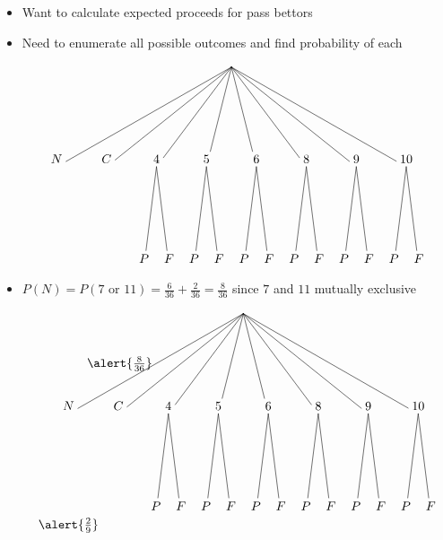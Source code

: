 \documentclass[handout]{beamer}
\theoremstyle{definition}
\begin{document}
\begin{frame}
\begin{itemize}
\item Want to calculate expected proceeds for pass bettors
\item Need to enumerate all possible outcomes and find probability of each
\[\begin{xy}<1.4cm,0cm>:
(4.5,0)="0"; (1,-2)="N"; (2,-2)="C"; (3,-2)="4";
(4,-2)="5"; (5,-2)="6"; (6,-2)="8"; (7,-2)="9"; (8,-2)="10";
"0";"N"*+!D{N}**\dir{-};
"0";"C"*+!D{C}**\dir{-};
"0";"4"*+!D{4}**\dir{-};
"0";"5"*+!D{5}**\dir{-};
"0";"6"*+!D{6}**\dir{-};
"0";"8"*+!D{8}**\dir{-};
"0";"9"*+!D{9}**\dir{-};
"0";"10"*+!D{10}**\dir{-};
"4";(2.75,-4)*+!D{P}**\dir{-};
"4";(3.25,-4)*+!D{F}**\dir{-};
"5";(3.75,-4)*+!D{P}**\dir{-};
"5";(4.25,-4)*+!D{F}**\dir{-};
"6";(4.75,-4)*+!D{P}**\dir{-};
"6";(5.25,-4)*+!D{F}**\dir{-};
"8";(5.75,-4)*+!D{P}**\dir{-};
"8";(6.25,-4)*+!D{F}**\dir{-};
"9";(6.75,-4)*+!D{P}**\dir{-};
"9";(7.25,-4)*+!D{F}**\dir{-};
"10";(7.75,-4)*+!D{P}**\dir{-};
"10";(8.25,-4)*+!D{F}**\dir{-};
\end{xy}\]
\end{itemize}
\end{frame}

\begin{frame}
\begin{itemize}
\item $P\left(N\right)=
P\left(\text{$7$ or $11$}\right)
=\frac{6}{36}+\frac{2}{36}=\frac{8}{36}$
since $7$ and $11$ mutually exclusive
\[\begin{xy}<1.4cm,0cm>:
(4.5,0)="0";
(1,-2)="N";(2,-2)="C";(3,-2)="4";(4,-2)="5";
(5,-2)="6";(6,-2)="8";(7,-2)="9";(8,-2)="10";
"0";"N"*+!D{N}**\dir{-}?*+!R{\alert{\frac{8}{36}}};
"0";"C"*+!D{C}**\dir{-};
"0";"4"*+!D{4}**\dir{-};
"0";"5"*+!D{5}**\dir{-};
"0";"6"*+!D{6}**\dir{-};
"0";"8"*+!D{8}**\dir{-};
"0";"9"*+!D{9}**\dir{-};
"0";"10"*+!D{10}**\dir{-};
"4";(2.75,-4)*+!D{P}**\dir{-};
"4";(3.25,-4)*+!D{F}**\dir{-};
"5";(3.75,-4)*+!D{P}**\dir{-};
"5";(4.25,-4)*+!D{F}**\dir{-};
"6";(4.75,-4)*+!D{P}**\dir{-};
"6";(5.25,-4)*+!D{F}**\dir{-};
"8";(5.75,-4)*+!D{P}**\dir{-};
"8";(6.25,-4)*+!D{F}**\dir{-};
"9";(6.75,-4)*+!D{P}**\dir{-};
"9";(7.25,-4)*+!D{F}**\dir{-};
"10";(7.75,-4)*+!D{P}**\dir{-};
"10";(8.25,-4)*+!D{F}**\dir{-};
(1,-4)*+!U{\alert{\frac{2}{9}}};
\end{xy}\]
\end{itemize}
\end{frame}
\end{document}
